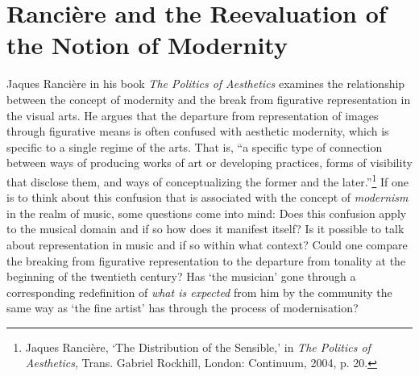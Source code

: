 
\section{Ranci\`{e}re and the Reevaluation of the \mbox{Notion} of Modernity}

Jaques Ranci\`{e}re in his book \emph{The Politics of Aesthetics} examines the relationship between the concept of modernity and the break from figurative representation in the visual arts. He argues that the departure from representation of images through figurative means is often confused with aesthetic modernity, which is specific to a single regime of the arts. That is, ``a specific type of connection between ways of producing works of art or developing practices, forms of visibility that disclose them, and ways of conceptualizing the former and the later.''\footnote{Jaques Ranci\`{e}re, `The Distribution of the Sensible,' in \emph{The Politics of Aesthetics}, Trans. Gabriel Rockhill, London: Continuum, 2004, p. 20.} If one is to think about this confusion that is associated with the concept of \emph{modernism} in the realm of music, some questions come into mind: Does this confusion apply to the musical domain and if so how does it manifest itself? Is it possible to talk about representation in music and if so within what context? Could one compare the breaking from figurative representation to the departure from tonality at the beginning of the twentieth century? Has `the musician' gone through a corresponding redefinition of \emph{what is expected} from him by the community the same way as `the fine artist' has through the process of modernisation?

